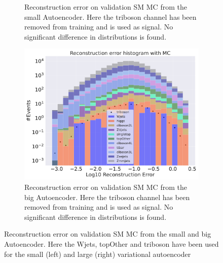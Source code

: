 \begin{figure}[H]
\begin{subfigure}{.45\textwidth}
        \caption{Reconstruction error on validation SM MC from the small Autoencoder. Here the triboson channel has been removed from training and 
        is used as signal. No significant difference in distributions is found. }
        \label{fig:vae_small_triboson}
    \end{subfigure}
    \hfill 
    \begin{subfigure}{.45\textwidth}
        \includegraphics[width=\textwidth]{Figures/VAE_testing/big/b_data_recon_big_rm3_feats_sig_triboson.pdf}
        \caption{Reconstruction error on validation SM MC from the big Autoencoder. Here the triboson channel has been removed from training and 
        is used as signal. No significant difference in distributions is found. }
        \label{fig:vae_big_triboson}
    \end{subfigure}
    \hfill  
    \caption[VAE | Channel removal, Wjets, topOther, triboson]{Reconstruction error on validation SM MC from the small and big Autoencoder. 
    Here the Wjets, topOther and triboson have been used for the small (left) and large (right) variational autoencoder}
    \label{fig:vae_big_channel4}
\end{figure}

